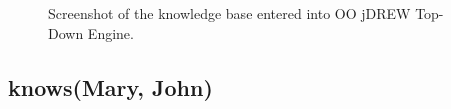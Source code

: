 \documentclass[letterpaper,10pt,english]{sphinxmanual}
\begin{document}
\begin{figure}[htbp]
\centering
\capstart

\caption{Screenshot of the knowledge base entered into OO jDREW Top-Down Engine.}\end{figure}


\subsection{knows(Mary, John)}
\label{assign3:knows-mary-john}\begin{figure}[htbp]
\centering

\end{figure}
\end{document}
